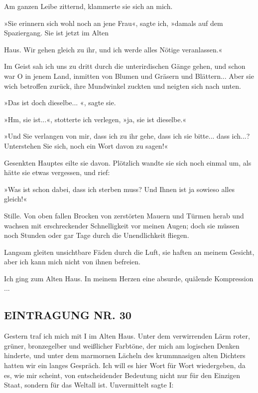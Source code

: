 Am ganzen Leibe zitternd, klammerte sie sich an mich.

»Sie erinnern sich wohl noch an jene Frau«, sagte ich, »damals auf
dem Spaziergang. Sie ist jetzt im Alten

Haus. Wir gehen gleich zu ihr, und ich werde alles Nötige
veranlassen.«

Im Geist sah ich uns zu dritt durch die unterirdischen Gänge gehen,
und schon war O in jenem Land, inmitten von Blumen und Gräsern und
Blättern... Aber sie wich betroffen zurück, ihre Mundwinkel zuckten
und neigten sich nach unten.

»Das ist doch dieselbe... «, sagte sie.

»Hm, sie ist...«, stotterte ich verlegen, »ja, sie ist dieselbe.«

»Und Sie verlangen von mir, dass ich zu ihr gehe, dass ich sie
bitte... dass ich...? Unterstehen Sie sich, noch ein Wort davon zu
sagen!«

Gesenkten Hauptes eilte sie davon. Plötzlich wandte sie sich noch
einmal um, als hätte sie etwas vergessen, und rief:

»Was ist schon dabei, dass ich sterben muss? Und Ihnen ist ja
sowieso alles gleich!«

Stille. Von oben fallen Brocken von zerstörten Mauern und Türmen
herab und wachsen mit erschreckender Schnelligkeit vor meinen
Augen; doch sie müssen noch Stunden oder gar Tage durch die
Unendlichkeit fliegen.

Langsam gleiten unsichtbare Fäden durch die Luft, sie haften an
meinem Gesicht, aber ich kann mich nicht von ihnen befreien.

Ich ging zum Alten Haus. In meinem Herzen eine absurde, quälende
Kompression ...

\subsection{EINTRAGUNG NR. 30}

Gestern traf ich mich mit I im Alten Haus. Unter dem verwirrenden
Lärm roter, grüner, bronzegelber und weißlicher Farbtöne, der mich
am logischen Denken hinderte, und unter dem marmornen Lächeln des
krummnasigen alten Dichters hatten wir ein langes Gespräch. Ich
will es hier Wort für Wort wiedergeben, da es, wie mir scheint, von
entscheidender Bedeutung nicht nur für den Einzigen Staat, sondern
für das Weltall ist. Unvermittelt sagte I:

